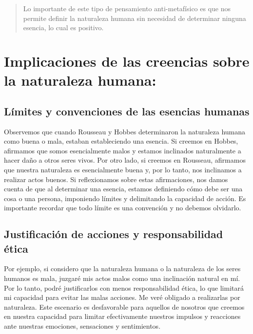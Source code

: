 \documentclass[
  a4paper,
]{article}
\begin{document}
\begin{quote}
Lo importante de este tipo de pensamiento anti-metafísico es que nos
permite definir la naturaleza humana sin necesidad de determinar ninguna
esencia, lo cual es positivo.
\end{quote}

\section{Implicaciones de las creencias sobre la naturaleza
humana:}\label{implicaciones-de-las-creencias-sobre-la-naturaleza-humana}

\subsection{Límites y convenciones de las esencias
humanas}\label{luxedmites-y-convenciones-de-las-esencias-humanas}

Observemos que cuando Rousseau y Hobbes determinaron la naturaleza
humana como buena o mala, estaban estableciendo una esencia. Si creemos
en Hobbes, afirmamos que somos esencialmente malos y estamos inclinados
naturalmente a hacer daño a otros seres vivos. Por otro lado, si creemos
en Rousseau, afirmamos que nuestra naturaleza es esencialmente buena y,
por lo tanto, nos inclinamos a realizar actos buenos. Si reflexionamos
sobre estas afirmaciones, nos damos cuenta de que al determinar una
esencia, estamos definiendo cómo debe ser una cosa o una persona,
imponiendo límites y delimitando la capacidad de acción. Es importante
recordar que todo límite es una convención y no debemos olvidarlo.

\subsection{Justificación de acciones y responsabilidad
ética}\label{justificaciuxf3n-de-acciones-y-responsabilidad-uxe9tica}

Por ejemplo, si considero que la naturaleza humana o la naturaleza de
los seres humanos es mala, juzgaré mis actos malos como una inclinación
natural en mí. Por lo tanto, podré justificarlos con menos
responsabilidad ética, lo que limitará mi capacidad para evitar las
malas acciones. Me veré obligado a realizarlas por naturaleza. Este
escenario es desfavorable para aquellos de nosotros que creemos en
nuestra capacidad para limitar efectivamente nuestros impulsos y
reacciones ante nuestras emociones, sensaciones y sentimientos.
\end{document}
